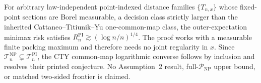 For arbitrary law-independent point-indexed distance families \(\{T_{n,x}\}\) whose fixed-point sections are Borel measurable, a decision class strictly larger than the inherited Cattaneo--Titiunik--Yu one-common-map class, the outer-expectation minimax risk satisfies \(R_n^{\mathrm{PI}}\gtrsim(\log n/n)^{1/4}\).  The proof works with a measurable finite packing maximum and therefore needs no joint regularity in \(x\).  Since \(\mathcal T_n^{\mathrm{NP}}\subsetneq\mathcal T_n^{\mathrm{PI}}\), the CTY common-map logarithmic converse follows by inclusion and resolves their printed conjecture.  No Assumption~2 result, full-\(\mathcal P_{\mathrm{NP}}\) upper bound, or matched two-sided frontier is claimed.